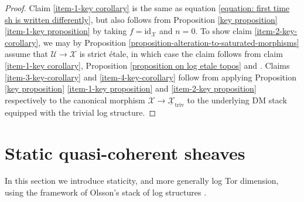 \documentclass[11pt]{amsart}
\theoremstyle{definition}
\theoremstyle{definition}
\newcommand{\cU}{\mathcal{U}}
\newcommand{\cX}{\mathcal{X}}
\newcommand{\cal}{\mathcal}
\def\cU{{\cal U}}
\def\cX{{\cal X}}
\begin{document}
\begin{proof}
Claim \eqref{item-1-key corollary} is the same as equation \eqref{equation: first time sh is written differently}, but also follows from Proposition \ref{key proposition} \eqref{item-1-key proposition} by taking $f=\text{id}_\cX$ and $n=0$. To show claim \eqref{item-2-key-corollary}, we may by Proposition \ref{proposition-alteration-to-saturated-morphisms} assume that $\cU\rightarrow \cX$ is strict \'etale, in which case the claim follows from claim \eqref{item-1-key corollary}, Proposition \ref{proposition on log etale topos} and \cite[Corollaire VI.8.7.7]{SGA4}. Claims \eqref{item-3-key-corollary} and \eqref{item-4-key-corollary} follow from applying Proposition \ref{key proposition} \eqref{item-1-key proposition} and \eqref{item-2-key proposition} respectively to the canonical morphism $\cX\rightarrow \underline{\cX}_{\text{triv}}$ to the underlying DM stack equipped with the trivial log structure.
\end{proof}
\section{Static quasi-coherent sheaves}
In this section we introduce staticity, and more generally log Tor dimension, using the framework of Olsson's stack of log structures \cite{log-geometry-and-algebraic-stacks}.
\end{document}
